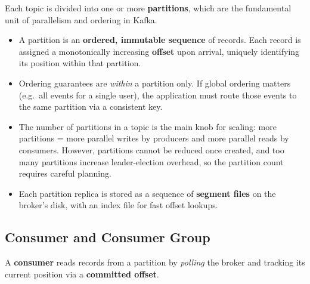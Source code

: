 Each topic is divided into one or more \textbf{partitions}, which are the fundamental
unit of parallelism and ordering in Kafka.

\begin{itemize}
  \item A partition is an \textbf{ordered, immutable sequence} of records.
        Each record is assigned a monotonically increasing \textbf{offset} upon arrival,
        uniquely identifying its position within that partition.
  \item Ordering guarantees are \emph{within} a partition only.
        If global ordering matters (e.g.\ all events for a single user), the application must
        route those events to the same partition via a consistent key.
  \item The number of partitions in a topic is the main knob for scaling:
        more partitions = more parallel writes by producers and more parallel reads by consumers.
        However, partitions cannot be reduced once created, and too many partitions increase
        leader-election overhead, so the partition count requires careful planning.
  \item Each partition replica is stored as a sequence of \textbf{segment files} on the broker's disk,
        with an index file for fast offset lookups.
\end{itemize}

\subsection{Consumer and Consumer Group}

A \textbf{consumer} reads records from a partition by \emph{polling} the broker and
tracking its current position via a \textbf{committed offset}.

